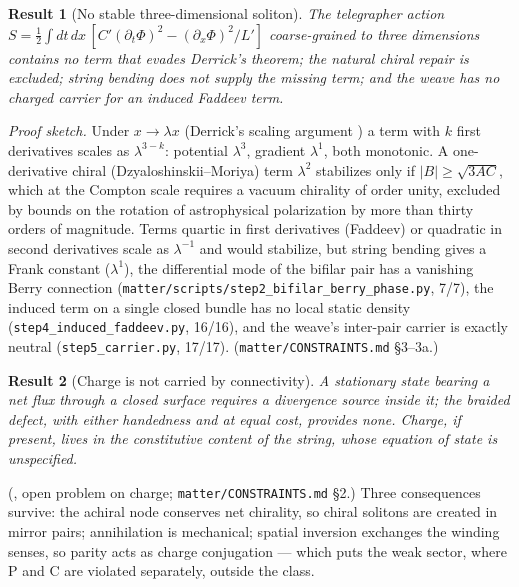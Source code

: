 \documentclass[11pt,a4paper]{article}
\newtheorem{prop}{Result}
\begin{document}
\begin{prop}[No stable three-dimensional soliton]
The telegrapher action $S = \tfrac12\int dt\,dx\,[C'(\partial_t\Phi)^2 - (\partial_x\Phi)^2/L']$ coarse-grained to three dimensions contains no term that evades Derrick's theorem; the natural chiral repair is excluded; string bending does not supply the missing term; and the weave has no charged carrier for an induced Faddeev term.
\end{prop}
\noindent\emph{Proof sketch.} Under $x \to \lambda x$ (Derrick's scaling argument \cite{derrick1964}) a term with $k$ first derivatives scales as $\lambda^{3-k}$: potential $\lambda^3$, gradient $\lambda^1$, both monotonic. A one-derivative chiral (Dzyaloshinskii--Moriya) term $\lambda^2$ stabilizes only if $|B| \ge \sqrt{3AC}$, which at the Compton scale requires a vacuum chirality of order unity, excluded by bounds on the rotation of astrophysical polarization by more than thirty orders of magnitude. Terms quartic in first derivatives (Faddeev) or quadratic in second derivatives scale as $\lambda^{-1}$ and would stabilize, but string bending gives a Frank constant ($\lambda^1$), the differential mode of the bifilar pair has a vanishing Berry connection (\texttt{matter/scripts/step2\_bifilar\_berry\_phase.py}, 7/7), the induced term on a single closed bundle has no local static density (\texttt{step4\_induced\_faddeev.py}, 16/16), and the weave's inter-pair carrier is exactly neutral (\texttt{step5\_carrier.py}, 17/17). (\texttt{matter/CONSTRAINTS.md} \S3--3a.)

\begin{prop}[Charge is not carried by connectivity]
A stationary state bearing a net flux through a closed surface requires a divergence source inside it; the braided defect, with either handedness and at equal cost, provides none. Charge, if present, lives in the constitutive content of the string, whose equation of state is unspecified.
\end{prop}
\noindent(\cite{ds_v210}, open problem on charge; \texttt{matter/CONSTRAINTS.md} \S2.) Three consequences survive: the achiral node conserves net chirality, so chiral solitons are created in mirror pairs; annihilation is mechanical; spatial inversion exchanges the winding senses, so parity acts as charge conjugation --- which puts the weak sector, where P and C are violated separately, outside the class.
\end{document}
